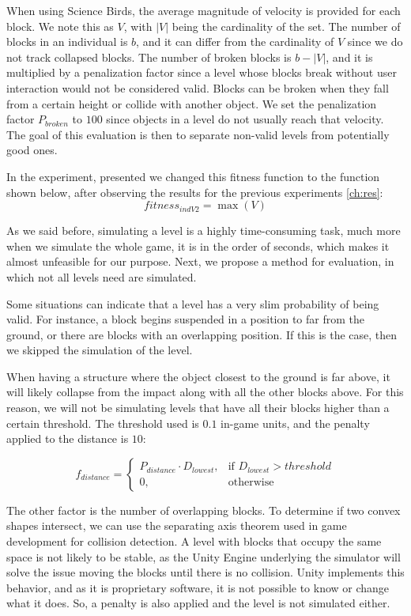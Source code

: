 \documentclass[a4paper,twoside]{article}
\begin{document}
When using Science Birds, the average magnitude of velocity is provided for each block. We note this as $V$, with $|V|$ being the cardinality of the set. The number of blocks in an individual is $b$, and it can differ from the cardinality of $V$ since we do not track collapsed blocks. The number of broken blocks is $b-|V|$, and it is multiplied by a penalization factor since a level whose blocks break without user interaction would not be considered valid.  Blocks can be broken when they fall from a certain height or collide with another object. We set the penalization factor $P_{broken}$ to $100$ since objects in a level do not usually reach that  velocity.  The goal of this evaluation is then to separate non-valid levels from potentially good ones.

In the experiment, presented we changed this fitness function to the function shown below, after observing the results for the previous experiments \ref{ch:res}: 
$$fitness_{indV2} = \max{(V)}$$

As we said before, simulating a level is a highly time-consuming task, much more when we simulate the whole game, it is in the order of seconds, which makes it almost unfeasible for our purpose. Next, we propose a method for evaluation, in which not all levels need are simulated.

Some situations can indicate that a level has a very slim probability of being valid.  For instance, a block begins suspended in a position to far from the ground, or there are blocks with an overlapping position. If this is the case, then we skipped the simulation of the level. 

When having a structure where the object closest to the ground is far above, it will likely collapse from the impact along with all the other blocks above. For this reason, we will not be simulating levels that have all their blocks higher than a  certain threshold. The threshold used is $0.1$ in-game units, and the penalty applied to the distance is $10$:

$$f_{distance} = 
\begin{cases}
P_{distance}\cdot D_{lowest}, & \text{if } D_{lowest} > threshold\\
0, & \text{otherwise}
\end{cases}
$$


The other factor is the number of overlapping blocks. To determine if two convex shapes intersect, we can use the separating axis theorem \cite{ericson2004real}  used in game development for collision detection. A level with blocks that occupy the same space is not likely to be stable, as the Unity Engine underlying the simulator will solve the issue moving the blocks until there is no collision. Unity implements this behavior, and as it is proprietary software, it is not possible to know or change what it does. So, a penalty is also applied and the level is not simulated either. 
\end{document}

